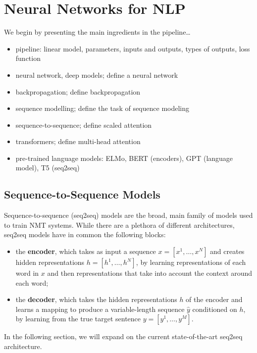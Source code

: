 \section{Neural Networks for NLP}
\label{sec:nmt}

We begin by presenting the main ingredients in the pipeline\dots

\begin{itemize}
    \item pipeline: linear model, parameters, inputs and outputs, types of outputs, loss function
    \item neural network, deep models; define a neural network
    \item backpropagation; define backpropagation
    \item sequence modelling; define the task of sequence modeling
    \item sequence-to-sequence; define scaled attention
    \item transformers; define multi-head attention
    \item pre-trained language models: ELMo, BERT (encoders), GPT (language model), T5 (seq2seq)
\end{itemize}

\subsection{Sequence-to-Sequence Models}
\label{sec:transformer_bg}

Sequence-to-sequence (seq2seq) models are the broad, main family of models
used to train NMT systems. While there are a plethora of different architectures,
seq2seq models have in common the following blocks:

\begin{itemize}
    \item the {\bf encoder}, which takes as input a sequence $x=[x^1,
              \dots, x^N]$ and creates hidden representations $h=[h^1, \dots,
              h^N]$, by learning representations of each word in $x$ and then
          representations that take into account the context around each word;
    \item the {\bf decoder}, which takes the hidden representations
          $h$ of the encoder and learns a mapping to produce a
          variable-length sequence $\hat{y}$ conditioned on $h$, by
          learning from the true target sentence $y=[y^1, \dots, y^M]$.
\end{itemize}

In the following section, we will expand on the current
state-of-the-art seq2seq architecture.

